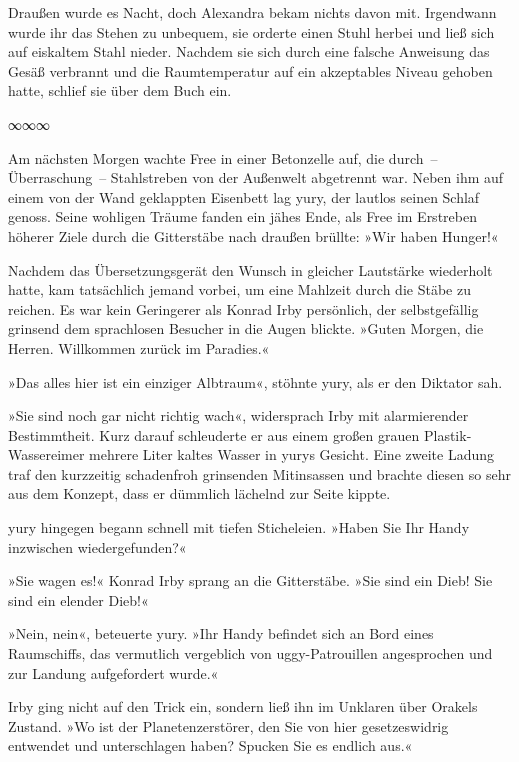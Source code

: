 Draußen wurde es Nacht, doch Alexandra bekam nichts davon mit. Irgendwann wurde ihr das Stehen zu unbequem, sie orderte einen Stuhl herbei und ließ sich auf eiskaltem Stahl nieder. Nachdem sie sich durch eine falsche Anweisung das Gesäß verbrannt und die Raumtemperatur auf ein akzeptables Niveau gehoben hatte, schlief sie über dem Buch ein.

\begin{center}
∞∞∞
\end{center}

Am nächsten Morgen wachte Free in einer Betonzelle auf, die durch~– Überraschung~– Stahlstreben von der Außenwelt abgetrennt war. Neben ihm auf einem von der Wand geklappten Eisenbett lag yury, der lautlos seinen Schlaf genoss. Seine wohligen Träume fanden ein jähes Ende, als Free im Erstreben höherer Ziele durch die Gitterstäbe nach draußen brüllte: »Wir haben Hunger!«

Nachdem das Übersetzungsgerät den Wunsch in gleicher Lautstärke wiederholt hatte, kam tatsächlich jemand vorbei, um eine Mahlzeit durch die Stäbe zu reichen. Es war kein Geringerer als Konrad Irby persönlich, der selbstgefällig grinsend dem sprachlosen Besucher in die Augen blickte. »Guten Morgen, die Herren. Willkommen zurück im Paradies.«

»Das alles hier ist ein einziger Albtraum«, stöhnte yury, als er den Diktator sah.

»Sie sind noch gar nicht richtig wach«, widersprach Irby mit alarmierender Bestimmtheit. Kurz darauf schleuderte er aus einem großen grauen Plastik-Wassereimer mehrere Liter kaltes Wasser in yurys Gesicht. Eine zweite Ladung traf den kurzzeitig schadenfroh grinsenden Mitinsassen und brachte diesen so sehr aus dem Konzept, dass er dümmlich lächelnd zur Seite kippte.

yury hingegen begann schnell mit tiefen Sticheleien. »Haben Sie Ihr Handy inzwischen wiedergefunden?«

»Sie wagen es!« Konrad Irby sprang an die Gitterstäbe. »Sie sind ein Dieb! Sie sind ein elender Dieb!«

»Nein, nein«, beteuerte yury. »Ihr Handy befindet sich an Bord eines Raumschiffs, das vermutlich vergeblich von uggy-Patrouillen angesprochen und zur Landung aufgefordert wurde.«

Irby ging nicht auf den Trick ein, sondern ließ ihn im Unklaren über Orakels Zustand. »Wo ist der Planetenzerstörer, den Sie von hier gesetzeswidrig entwendet und unterschlagen haben? Spucken Sie es endlich aus.«

